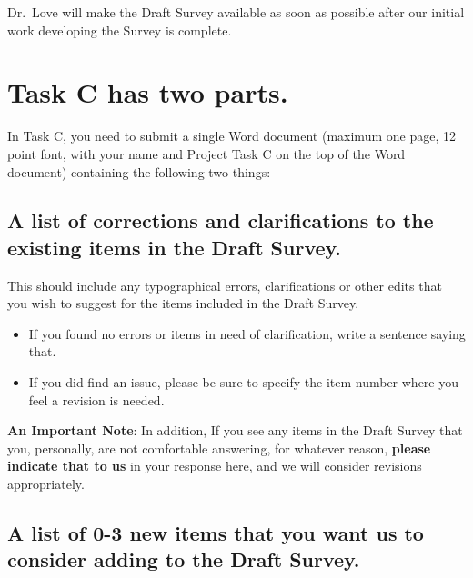 \documentclass[]{book}
\providecommand{\tightlist}{%
  \setlength{\itemsep}{0pt}\setlength{\parskip}{0pt}}
\theoremstyle{definition}
\theoremstyle{definition}
\theoremstyle{definition}
\theoremstyle{remark}
\begin{document}
Dr.~Love will make the Draft Survey available as soon as possible after
our initial work developing the Survey is complete.

\hypertarget{task-c-has-two-parts.}{%
\section{Task C has two parts.}\label{task-c-has-two-parts.}}

In Task C, you need to submit a single Word document (maximum one page,
12 point font, with your name and Project Task C on the top of the Word
document) containing the following two things:

\hypertarget{a-list-of-corrections-and-clarifications-to-the-existing-items-in-the-draft-survey.}{%
\subsection{A list of corrections and clarifications to the existing
items in the Draft
Survey.}\label{a-list-of-corrections-and-clarifications-to-the-existing-items-in-the-draft-survey.}}

This should include any typographical errors, clarifications or other
edits that you wish to suggest for the items included in the Draft
Survey.

\begin{itemize}
\tightlist
\item
  If you found no errors or items in need of clarification, write a
  sentence saying that.
\item
  If you did find an issue, please be sure to specify the item number
  where you feel a revision is needed.
\end{itemize}

\textbf{An Important Note}: In addition, If you see any items in the
Draft Survey that you, personally, are not comfortable answering, for
whatever reason, \textbf{please indicate that to us} in your response
here, and we will consider revisions appropriately.

\hypertarget{a-list-of-0-3-new-items-that-you-want-us-to-consider-adding-to-the-draft-survey.}{%
\subsection{A list of 0-3 new items that you want us to consider adding
to the Draft
Survey.}\label{a-list-of-0-3-new-items-that-you-want-us-to-consider-adding-to-the-draft-survey.}}
\end{document}
